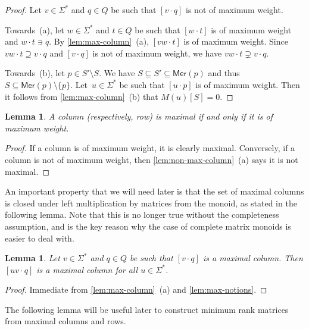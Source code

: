 \documentclass[11pt,a4paper]{amsart}
\newcommand{\Mer}{\mathsf{Mer}}
\theoremstyle{plain}
\newtheorem{lem}[thm]{Lemma}
\theoremstyle{definition}
\theoremstyle{defC}
\theoremstyle{thmC}
\theoremstyle{plain}
\numberwithin{equation}{section}
\begin{document}
\begin{proof}
Let $v \in \Sigma^*$ and $q \in Q$ be such that $[v \cdot q]$ is not of maximum weight.

Towards~(a), let $w \in \Sigma^*$ and $t \in Q$ be such that $[w \cdot t]$ is of maximum weight and $w \cdot t \ni q$.
By \autoref{lem:max-column}~(a), $[v w \cdot t]$ is of maximum weight.
Since $v w \cdot t \supseteq v \cdot q$ and $[v \cdot q]$ is not of maximum weight, we have $v w \cdot t \supsetneq v \cdot q$.

Towards~(b), let $p \in S' \setminus S$.
We have $S \subseteq S' \subseteq \Mer(p)$ and thus $S \subseteq \Mer(p) \setminus \{p\}$.
Let~$u \in \Sigma^*$ be such that $[u \cdot p]$ is of maximum weight.
Then it follows from \autoref{lem:max-column}~(b) that $M(u) [S] = 0$.
\end{proof}

\begin{lem} \label{lem:max-notions}
    A column (respectively, row) is maximal if and only if it is of maximum weight.
\end{lem}
\begin{proof}
If a column is of maximum weight, it is clearly maximal.
Conversely, if a column is not of maximum weight, then \autoref{lem:non-max-column}~(a) says it is not maximal.
\end{proof}

\noindent
An important property that we will need later is that the set of maximal columns is closed under left multiplication by matrices from the monoid, as stated in the following lemma. Note that this is no longer true without the completeness assumption, and is the key reason why the case of complete matrix monoids is easier to deal with.

\begin{lem} \label{lem:max-column-stable}
Let $v \in \Sigma^*$ and $q \in Q$ be such that $[v \cdot q]$ is a maximal column. Then $[u v \cdot q]$ is a maximal column for all $u \in \Sigma^*$.
\end{lem}
\begin{proof}
Immediate from \autoref{lem:max-column}~(a) and \autoref{lem:max-notions}.
\end{proof}

\noindent
The following lemma will be useful later to construct minimum rank matrices from maximal columns and rows.
\end{document}
